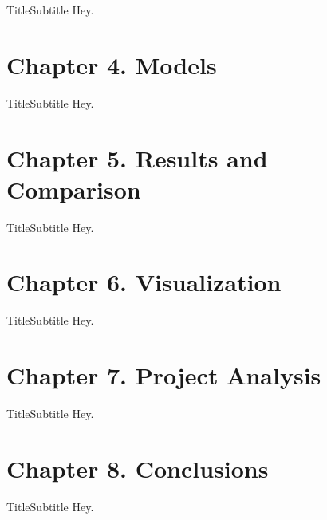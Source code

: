 \documentclass{beamer}
\begin{document}
\begin{frame}{Title}{Subtitle}
  Hey.
\end{frame}



\section{Chapter 4. Models}

\begin{frame}{Title}{Subtitle}
  Hey.
\end{frame}



\section{Chapter 5. Results and Comparison}

\begin{frame}{Title}{Subtitle}
  Hey.
\end{frame}



\section{Chapter 6. Visualization}

\begin{frame}{Title}{Subtitle}
  Hey.
\end{frame}



\section{Chapter 7. Project Analysis}

\begin{frame}{Title}{Subtitle}
  Hey.
\end{frame}



\section{Chapter 8. Conclusions}

\begin{frame}{Title}{Subtitle}
  Hey.
\end{frame}
\end{document}
